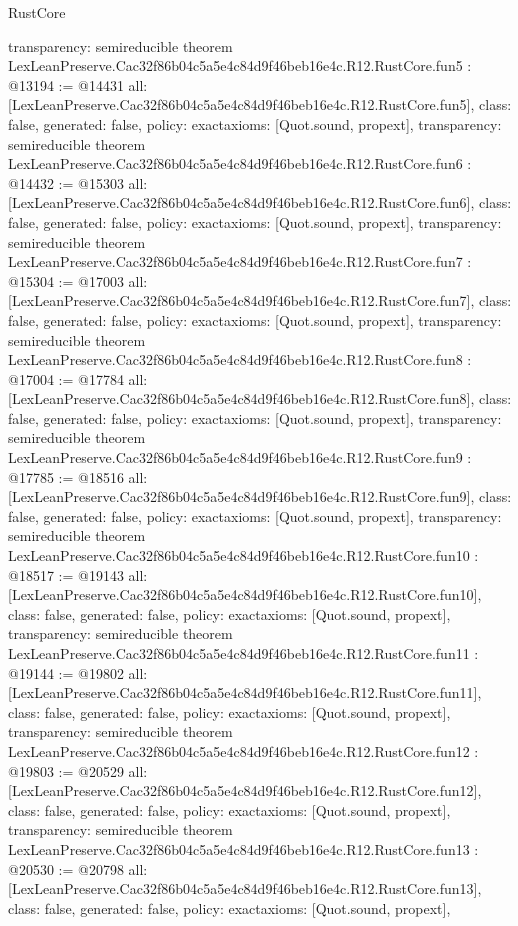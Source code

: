 \begin{lexlean}{RustCore}
\begin{coremodule}
{  transparency: semireducible
}
theorem LexLeanPreserve.Cac32f86b04c5a5e4c84d9f46beb16e4c.R12.RustCore.fun5 : @13194 := @14431 {
  all: [LexLeanPreserve.Cac32f86b04c5a5e4c84d9f46beb16e4c.R12.RustCore.fun5],
  class: false,
  generated: false,
  policy: exact{axioms: [Quot.sound, propext]},
  transparency: semireducible
}
theorem LexLeanPreserve.Cac32f86b04c5a5e4c84d9f46beb16e4c.R12.RustCore.fun6 : @14432 := @15303 {
  all: [LexLeanPreserve.Cac32f86b04c5a5e4c84d9f46beb16e4c.R12.RustCore.fun6],
  class: false,
  generated: false,
  policy: exact{axioms: [Quot.sound, propext]},
  transparency: semireducible
}
theorem LexLeanPreserve.Cac32f86b04c5a5e4c84d9f46beb16e4c.R12.RustCore.fun7 : @15304 := @17003 {
  all: [LexLeanPreserve.Cac32f86b04c5a5e4c84d9f46beb16e4c.R12.RustCore.fun7],
  class: false,
  generated: false,
  policy: exact{axioms: [Quot.sound, propext]},
  transparency: semireducible
}
theorem LexLeanPreserve.Cac32f86b04c5a5e4c84d9f46beb16e4c.R12.RustCore.fun8 : @17004 := @17784 {
  all: [LexLeanPreserve.Cac32f86b04c5a5e4c84d9f46beb16e4c.R12.RustCore.fun8],
  class: false,
  generated: false,
  policy: exact{axioms: [Quot.sound, propext]},
  transparency: semireducible
}
theorem LexLeanPreserve.Cac32f86b04c5a5e4c84d9f46beb16e4c.R12.RustCore.fun9 : @17785 := @18516 {
  all: [LexLeanPreserve.Cac32f86b04c5a5e4c84d9f46beb16e4c.R12.RustCore.fun9],
  class: false,
  generated: false,
  policy: exact{axioms: [Quot.sound, propext]},
  transparency: semireducible
}
theorem LexLeanPreserve.Cac32f86b04c5a5e4c84d9f46beb16e4c.R12.RustCore.fun10 : @18517 := @19143 {
  all: [LexLeanPreserve.Cac32f86b04c5a5e4c84d9f46beb16e4c.R12.RustCore.fun10],
  class: false,
  generated: false,
  policy: exact{axioms: [Quot.sound, propext]},
  transparency: semireducible
}
theorem LexLeanPreserve.Cac32f86b04c5a5e4c84d9f46beb16e4c.R12.RustCore.fun11 : @19144 := @19802 {
  all: [LexLeanPreserve.Cac32f86b04c5a5e4c84d9f46beb16e4c.R12.RustCore.fun11],
  class: false,
  generated: false,
  policy: exact{axioms: [Quot.sound, propext]},
  transparency: semireducible
}
theorem LexLeanPreserve.Cac32f86b04c5a5e4c84d9f46beb16e4c.R12.RustCore.fun12 : @19803 := @20529 {
  all: [LexLeanPreserve.Cac32f86b04c5a5e4c84d9f46beb16e4c.R12.RustCore.fun12],
  class: false,
  generated: false,
  policy: exact{axioms: [Quot.sound, propext]},
  transparency: semireducible
}
theorem LexLeanPreserve.Cac32f86b04c5a5e4c84d9f46beb16e4c.R12.RustCore.fun13 : @20530 := @20798 {
  all: [LexLeanPreserve.Cac32f86b04c5a5e4c84d9f46beb16e4c.R12.RustCore.fun13],
  class: false,
  generated: false,
  policy: exact{axioms: [Quot.sound, propext]},
}
\end{coremodule}
\end{lexlean}
